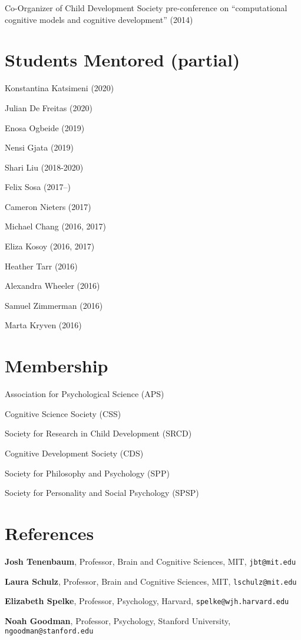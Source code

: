 \documentclass[margin,line,pifont,palatino,courier]{res}
\begin{document}
\begin{resume}
Co-Organizer of Child Development Society pre-conference on ``computational cognitive models and cognitive development'' (2014)

\section{\sc Students Mentored (partial)}

Konstantina Katsimeni (2020)

Julian De Freitas (2020)

Enosa Ogbeide (2019)

Nensi Gjata (2019)

Shari Liu (2018-2020)

Felix Sosa (2017--)

Cameron Nieters (2017)

Michael Chang (2016, 2017)

Eliza Kosoy (2016, 2017)

Heather Tarr (2016)

Alexandra Wheeler (2016)

Samuel Zimmerman (2016)

Marta Kryven (2016)


\section{\sc Membership}

Association for Psychological Science (APS)

Cognitive Science Society (CSS)

Society for Research in Child Development (SRCD)

Cognitive Development Society (CDS)

Society for Philosophy and Psychology (SPP)

Society for Personality and Social Psychology (SPSP)


\section{\sc References}

{\bf Josh Tenenbaum}, Professor,
Brain and Cognitive Sciences, MIT,
 \texttt{jbt@mit.edu}

{\bf Laura Schulz}, Professor,
Brain and Cognitive Sciences, MIT,
 \texttt{lschulz@mit.edu}

{\bf Elizabeth Spelke}, Professor,
Psychology, Harvard,
\texttt{spelke@wjh.harvard.edu}

{\bf Noah Goodman}, Professor,
Psychology, Stanford University,
 \texttt{ngoodman@stanford.edu}

\end{resume}
\end{document}
